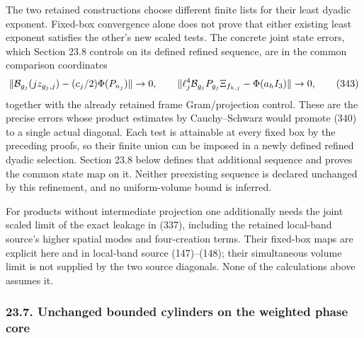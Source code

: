 \documentclass[
  11pt,
]{article}
\begin{document}
The two retained constructions choose different finite lists for their
least dyadic exponent. Fixed-box convergence alone does not prove that
either existing least exponent satisfies the other's new scaled tests.
The concrete joint state errors, which Section 23.8 controls on its
defined refined sequence, are in the common comparison coordinates \[
 \|{\cal B}_{g_j}(jz_{g_j,j})
                 -(c_j/2)\Phi(P_{n_j})\|\to0,\qquad
 \|\ell_j^4{\cal B}_{g_j}P_{g_j}\Xi_{f_{h,j}}
                 -\Phi(a_hI_3)\|\to0,
 \tag{343}
\] together with the already retained frame Gram/projection control.
These are the precise errors whose product estimates by Cauchy--Schwarz
would promote (340) to a single actual diagonal. Each test is attainable
at every fixed box by the preceding proofs, so their finite union can be
imposed in a newly defined refined dyadic selection. Section 23.8 below
defines that additional sequence and proves the common state map on it.
Neither preexisting sequence is declared unchanged by this refinement,
and no uniform-volume bound is inferred.

For products without intermediate projection one additionally needs the
joint scaled limit of the exact leakage in (337), including the retained
local-band source's higher spatial modes and four-creation terms. Their
fixed-box maps are explicit here and in local-band source (147)--(148);
their simultaneous volume limit is not supplied by the two source
diagonals. None of the calculations above assumes it.

\subsubsection{23.7. Unchanged bounded cylinders on the weighted phase
core}\label{unchanged-bounded-cylinders-on-the-weighted-phase-core}
\end{document}
